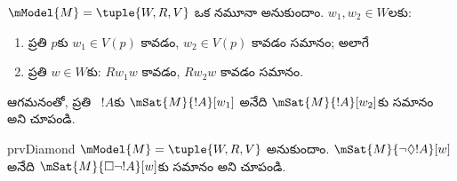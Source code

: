 \documentclass[../../../include/open-logic-section]{subfiles}
\begin{document}
\begin{prob}
  $\mModel{M} = \tuple{W, R, V}$
  ఒక నమూనా అనుకుందాం.
  $w_1, w_2 \in W$లకు:
  \begin{enumerate}
  \item ప్రతి
    $p$కు $w_1 \in V(p)$ కావడం, $w_2 \in V(p)$ కావడం సమానం; అలాగే
  \item ప్రతి $w \in W$కు:
    $Rw_1w$ కావడం, $Rw_2w$ కావడం సమానం.
  \end{enumerate}
  ఆగమనంతో, ప్రతి
  ~$!A$కు
  $\mSat{M}{!A}[w_1]$ అనేది $\mSat{M}{!A}[w_2]$కు సమానం
  అని చూపండి.
\end{prob}

\begin{probtag}{prvDiamond}
  $\mModel{M} = \tuple{W, R, V}$
  అనుకుందాం. $\mSat{M}{\lnot\Diamond !A}[w]$
  అనేది
  $\mSat{M}{\Box\lnot!A}[w]$కు సమానం
  అని చూపండి.
\end{probtag}
\end{document}
